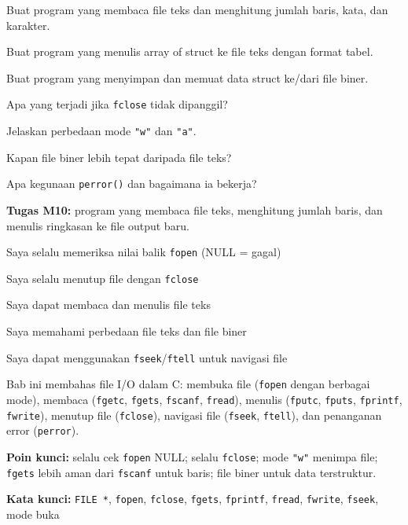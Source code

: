 \documentclass[../main.tex]{subfiles}
\begin{document}
\begin{aktivitas}
  \item Buat program yang membaca file teks dan menghitung jumlah baris, kata, dan karakter.
  \item Buat program yang menulis array of struct ke file teks dengan format tabel.
  \item Buat program yang menyimpan dan memuat data struct ke/dari file biner.
\end{aktivitas}

\begin{latihan}
  \item Apa yang terjadi jika \texttt{fclose} tidak dipanggil?
  \item Jelaskan perbedaan mode \texttt{"w"} dan \texttt{"a"}.
  \item Kapan file biner lebih tepat daripada file teks?
  \item Apa kegunaan \texttt{perror()} dan bagaimana ia bekerja?
\end{latihan}

\begin{asesmen}
\textbf{Tugas M10:} program yang membaca file teks, menghitung jumlah baris, dan menulis ringkasan ke file output baru.
\end{asesmen}

\begin{checklist}
  \item Saya selalu memeriksa nilai balik \texttt{fopen} (NULL = gagal)
  \item Saya selalu menutup file dengan \texttt{fclose}
  \item Saya dapat membaca dan menulis file teks
  \item Saya memahami perbedaan file teks dan file biner
  \item Saya dapat menggunakan \texttt{fseek}/\texttt{ftell} untuk navigasi file
\end{checklist}

\begin{rangkuman}
Bab ini membahas file I/O dalam C: membuka file (\texttt{fopen} dengan berbagai mode), membaca (\texttt{fgetc}, \texttt{fgets}, \texttt{fscanf}, \texttt{fread}), menulis (\texttt{fputc}, \texttt{fputs}, \texttt{fprintf}, \texttt{fwrite}), menutup file (\texttt{fclose}), navigasi file (\texttt{fseek}, \texttt{ftell}), dan penanganan error (\texttt{perror}).

\textbf{Poin kunci:} selalu cek \texttt{fopen} NULL; selalu \texttt{fclose}; mode \texttt{"w"} menimpa file; \texttt{fgets} lebih aman dari \texttt{fscanf} untuk baris; file biner untuk data terstruktur.

\textbf{Kata kunci:} \texttt{FILE *}, \texttt{fopen}, \texttt{fclose}, \texttt{fgets}, \texttt{fprintf}, \texttt{fread}, \texttt{fwrite}, \texttt{fseek}, mode buka
\end{rangkuman}
\end{document}
